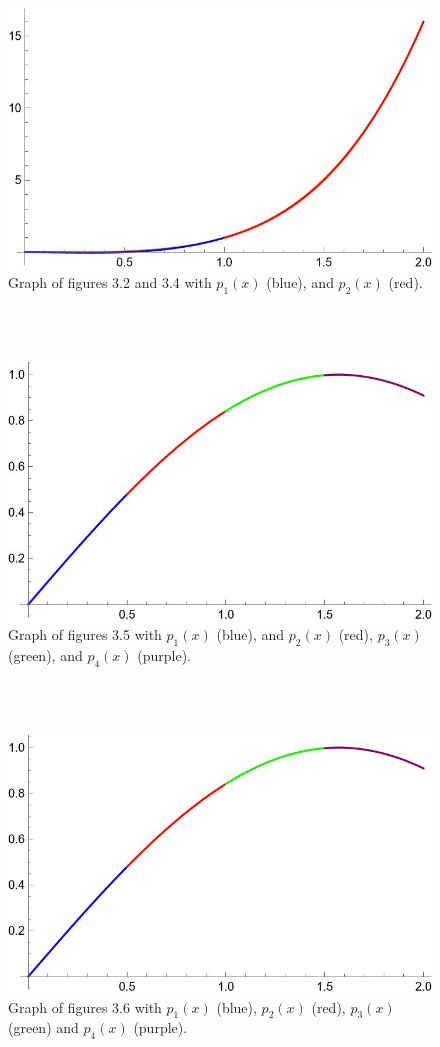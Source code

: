 \begin{figure}[htp]
    \centering
    \includegraphics[width=150mm]{splinething.jpg}
    \caption{Graph of figures 3.2 and 3.4 with $p_1(x)$ (blue), and $p_2(x)$ (red).}
    \label{fig:spline_example}
\end{figure}
\\\\
\begin{figure}[htp]
    \centering
    \includegraphics[width=150mm]{splinething2.jpg}
    \caption{Graph of figures 3.5 with $p_1(x)$ (blue), and $p_2(x)$ (red), $p_3(x)$ (green), and $p_4(x)$ (purple).}
    \label{fig:spline_example}
\end{figure}
\\\\
\begin{figure}[htp]
    \centering
    \includegraphics[width=150mm]{splinething3.jpg}
    \caption{Graph of figures 3.6 with $p_1(x)$ (blue), $p_2(x)$ (red), $p_3(x)$ (green) and $p_4(x)$ (purple).}
    \label{fig:spline_example}
\end{figure}